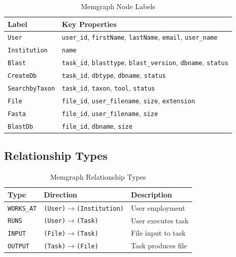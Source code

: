 \documentclass[a4paper,twoside]{sapthesis}
\begin{document}
\begin{table}[ht]
\centering
\caption{Memgraph Node Labels}
\label{tab:memgraph-nodes}
\small
\begin{tabularx}{\textwidth}{lX}
    \hline
    \textbf{Label} & \textbf{Key Properties} \\
    \hline
    \texttt{User} & \texttt{user\_id}, \texttt{firstName}, \texttt{lastName}, \texttt{email}, \texttt{user\_name} \\
    \texttt{Institution} & \texttt{name} \\
    \texttt{Blast} & \texttt{task\_id}, \texttt{blasttype}, \texttt{blast\_version}, \texttt{dbname}, \texttt{status} \\
    \texttt{CreateDb} & \texttt{task\_id}, \texttt{dbtype}, \texttt{dbname}, \texttt{status} \\
    \texttt{SearchbyTaxon} & \texttt{task\_id}, \texttt{taxon}, \texttt{tool}, \texttt{status} \\
    \texttt{File} & \texttt{file\_id}, \texttt{user\_filename}, \texttt{size}, \texttt{extension} \\
    \texttt{Fasta} & \texttt{file\_id}, \texttt{user\_filename}, \texttt{size} \\
    \texttt{BlastDb} & \texttt{file\_id}, \texttt{dbname}, \texttt{size} \\
    \hline
\end{tabularx}
\end{table}

\subsection{Relationship Types}

\begin{table}[ht]
\centering
\caption{Memgraph Relationship Types}
\label{tab:memgraph-rels}
\small
\begin{tabularx}{\textwidth}{llX}
    \hline
    \textbf{Type} & \textbf{Direction} & \textbf{Description} \\
    \hline
    \texttt{WORKS\_AT} & \texttt{(User)$\rightarrow$(Institution)} & User employment \\
    \texttt{RUNS} & \texttt{(User)$\rightarrow$(Task)} & User executes task \\
    \texttt{INPUT} & \texttt{(File)$\rightarrow$(Task)} & File input to task \\
    \texttt{OUTPUT} & \texttt{(Task)$\rightarrow$(File)} & Task produces file \\
    \hline
\end{tabularx}
\end{table}
\end{document}
